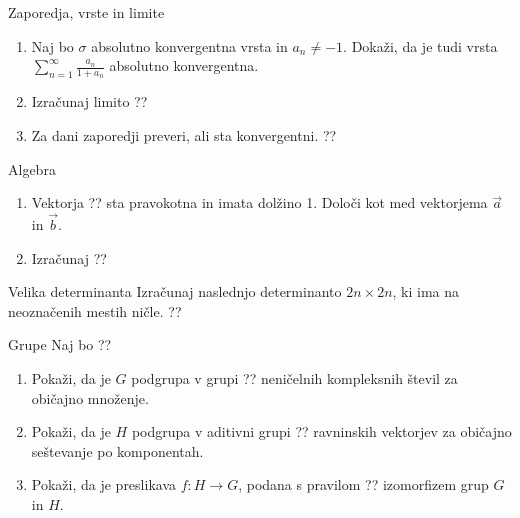 \begin{frame}{Zaporedja, vrste in limite}
	\begin{enumerate}
		\item 
		Naj bo \(\sigma\) absolutno konvergentna vrsta in $a_n \ne -1$.
		Dokaži, da je tudi vrsta $\sum_{n=1}^\infty \frac{a_n}{1+a_n}$
		absolutno konvergentna.

		\item
		Izračunaj limito
		??

		\item
		Za dani zaporedji preveri, ali sta konvergentni.
		??
	\end{enumerate}
\end{frame}

\begin{frame}{Algebra}
	\begin{enumerate}
		\item
		Vektorja ??
		sta pravokotna in imata dolžino 1. Določi kot med vektorjema $\vec{a}$ in $\vec{b}$.
		\item 
		Izračunaj
		??
	\end{enumerate}
\end{frame}

\begin{frame}{Velika determinanta}
	Izračunaj naslednjo determinanto $2n \times 2n$, ki ima na neoznačenih mestih ničle.
	??
\end{frame}

\begin{frame}{Grupe}
	Naj bo
	??
	\begin{enumerate}
		\item
			Pokaži, da je $G$ podgrupa v grupi ??
			neničelnih kompleksnih števil za običajno množenje.
		\item
			Pokaži, da je $H$ podgrupa v aditivni grupi ??
			ravninskih vektorjev za običajno seštevanje po komponentah.
		\item
			Pokaži, da je preslikava $f:H\to G$, podana s pravilom
			??
			izomorfizem grup $G$ in $H$.
	\end{enumerate}
\end{frame}
